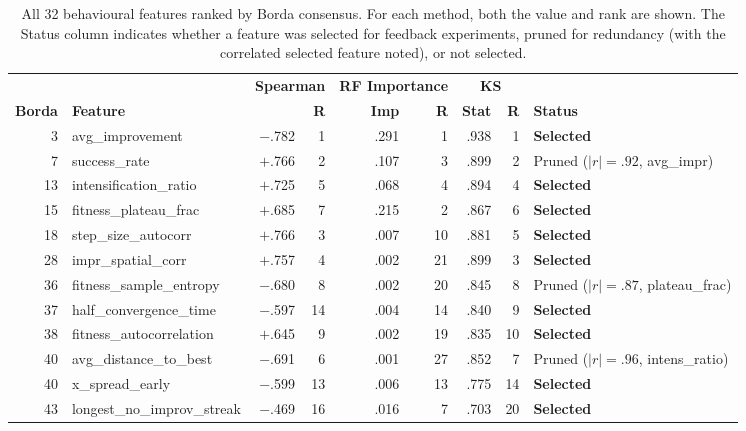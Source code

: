 \begin{table}[p]
\centering
\caption{All 32 behavioural features ranked by Borda consensus. For each method, both the value and rank are shown. The Status column indicates whether a feature was selected for feedback experiments, pruned for redundancy (with the correlated selected feature noted), or not selected.}
\label{tab:feature-consensus}
\footnotesize
\setlength{\tabcolsep}{3.5pt}
\begin{tabular}{@{}rlrrrrrrl@{}}
\toprule
& & \multicolumn{2}{c}{\textbf{Spearman}} & \multicolumn{2}{c}{\textbf{RF Importance}} & \multicolumn{2}{c}{\textbf{KS}} & \\
\cmidrule(lr){3-4} \cmidrule(lr){5-6} \cmidrule(lr){7-8}
\textbf{Borda} & \textbf{Feature} & \boldmath{$\rho$} & \textbf{R} & \textbf{Imp} & \textbf{R} & \textbf{Stat} & \textbf{R} & \textbf{Status} \\
\midrule
3  & avg\_improvement              & $-$.782 &  1 & .291 &  1 & .938 &  1 & \textbf{Selected} \\
7  & success\_rate                 & $+$.766 &  2 & .107 &  3 & .899 &  2 & Pruned ($|r|{=}.92$, avg\_impr) \\
13 & intensification\_ratio        & $+$.725 &  5 & .068 &  4 & .894 &  4 & \textbf{Selected} \\
15 & fitness\_plateau\_frac        & $+$.685 &  7 & .215 &  2 & .867 &  6 & \textbf{Selected} \\
18 & step\_size\_autocorr          & $+$.766 &  3 & .007 & 10 & .881 &  5 & \textbf{Selected} \\
28 & impr\_spatial\_corr           & $+$.757 &  4 & .002 & 21 & .899 &  3 & \textbf{Selected} \\
36 & fitness\_sample\_entropy      & $-$.680 &  8 & .002 & 20 & .845 &  8 & Pruned ($|r|{=}.87$, plateau\_frac) \\
37 & half\_convergence\_time       & $-$.597 & 14 & .004 & 14 & .840 &  9 & \textbf{Selected} \\
38 & fitness\_autocorrelation      & $+$.645 &  9 & .002 & 19 & .835 & 10 & \textbf{Selected} \\
40 & avg\_distance\_to\_best       & $-$.691 &  6 & .001 & 27 & .852 &  7 & Pruned ($|r|{=}.96$, intens\_ratio) \\
40 & x\_spread\_early              & $-$.599 & 13 & .006 & 13 & .775 & 14 & \textbf{Selected} \\
43 & longest\_no\_improv\_streak   & $-$.469 & 16 & .016 &  7 & .703 & 20 & \textbf{Selected} \\

\end{tabular}
\end{table}
